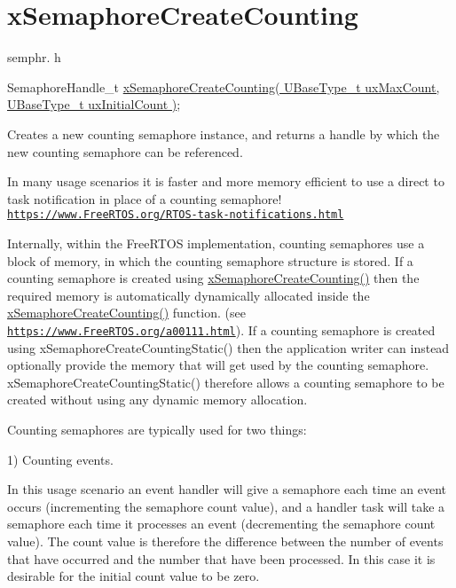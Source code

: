 \hypertarget{group__x_semaphore_create_counting}{}\section{x\+Semaphore\+Create\+Counting}
\label{group__x_semaphore_create_counting}
semphr. h 
\begin{DoxyPre}
SemaphoreHandle\_t \hyperlink{vendor_2ceedling_2plugins_2freertos_2src_2freertos_2include_2semphr_8h_a7764616a918a46115403569a88148ad4}{xSemaphoreCreateCounting( UBaseType\_t uxMaxCount, UBaseType\_t uxInitialCount )};
\end{DoxyPre}


Creates a new counting semaphore instance, and returns a handle by which the new counting semaphore can be referenced.

In many usage scenarios it is faster and more memory efficient to use a direct to task notification in place of a counting semaphore! \href{https://www.FreeRTOS.org/RTOS-task-notifications.html}{\tt https\+://www.\+Free\+R\+T\+O\+S.\+org/\+R\+T\+O\+S-\/task-\/notifications.\+html}

Internally, within the Free\+R\+T\+OS implementation, counting semaphores use a block of memory, in which the counting semaphore structure is stored. If a counting semaphore is created using \hyperlink{vendor_2ceedling_2plugins_2freertos_2src_2freertos_2include_2semphr_8h_a7764616a918a46115403569a88148ad4}{x\+Semaphore\+Create\+Counting()} then the required memory is automatically dynamically allocated inside the \hyperlink{vendor_2ceedling_2plugins_2freertos_2src_2freertos_2include_2semphr_8h_a7764616a918a46115403569a88148ad4}{x\+Semaphore\+Create\+Counting()} function. (see \href{https://www.FreeRTOS.org/a00111.html}{\tt https\+://www.\+Free\+R\+T\+O\+S.\+org/a00111.\+html}). If a counting semaphore is created using x\+Semaphore\+Create\+Counting\+Static() then the application writer can instead optionally provide the memory that will get used by the counting semaphore. x\+Semaphore\+Create\+Counting\+Static() therefore allows a counting semaphore to be created without using any dynamic memory allocation.

Counting semaphores are typically used for two things\+:

1) Counting events.

In this usage scenario an event handler will \textquotesingle{}give\textquotesingle{} a semaphore each time an event occurs (incrementing the semaphore count value), and a handler task will \textquotesingle{}take\textquotesingle{} a semaphore each time it processes an event (decrementing the semaphore count value). The count value is therefore the difference between the number of events that have occurred and the number that have been processed. In this case it is desirable for the initial count value to be zero.

